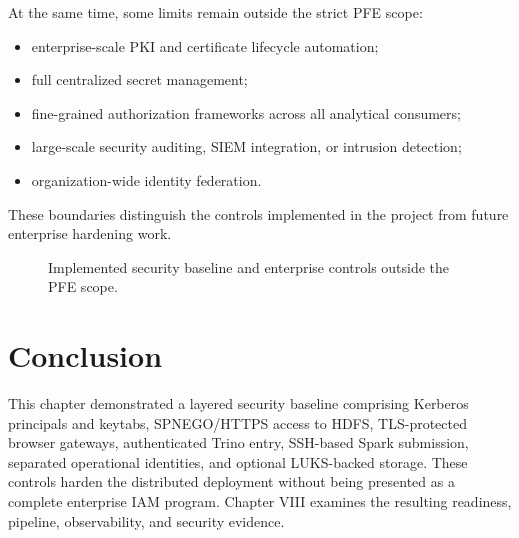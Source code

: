 At the same time, some limits remain outside the strict PFE scope:
\begin{itemize}
    \item enterprise-scale PKI and certificate lifecycle automation;
    \item full centralized secret management;
    \item fine-grained authorization frameworks across all analytical consumers;
    \item large-scale security auditing, SIEM integration, or intrusion detection;
    \item organization-wide identity federation.
\end{itemize}

These boundaries distinguish the controls implemented in the project from future enterprise hardening work.

\begin{figure}[H]
    \centering
    
    \caption{Implemented security baseline and enterprise controls outside the PFE scope.}
    \label{fig:chapter7-security-boundaries}
\end{figure}

\section{Conclusion}
This chapter demonstrated a layered security baseline comprising Kerberos principals and keytabs, SPNEGO/HTTPS access to HDFS, TLS-protected browser gateways, authenticated Trino entry, SSH-based Spark submission, separated operational identities, and optional LUKS-backed storage. These controls harden the distributed deployment without being presented as a complete enterprise IAM program. Chapter VIII examines the resulting readiness, pipeline, observability, and security evidence.
